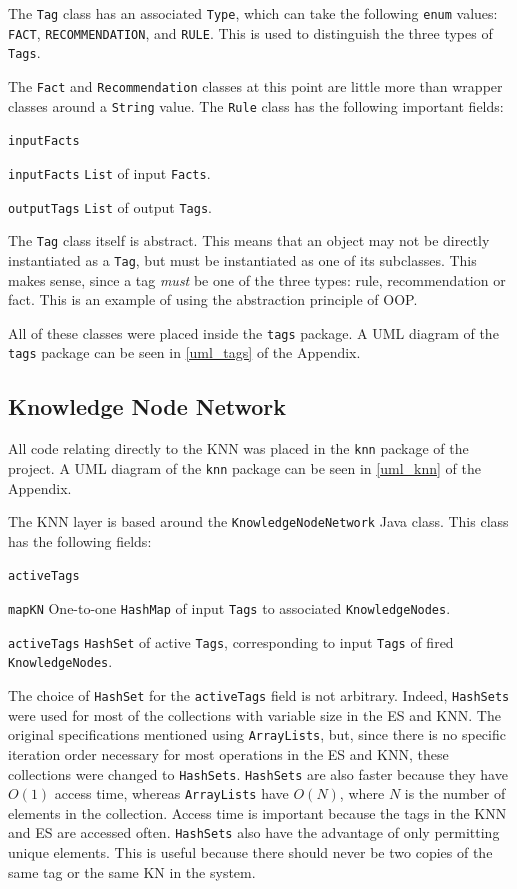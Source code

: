 \documentclass[titlepage,11pt]{article}
\newcommand{\code}[1]{\texttt{#1}}
\begin{document}
The \code{Tag} class has an associated \code{Type}, which can take the following \code{enum} values: \code{FACT}, \code{RECOMMENDATION}, and \code{RULE}. This is used to distinguish the three types of \code{Tags}.

The \code{Fact} and \code{Recommendation} classes at this point are little more than wrapper classes around a \code{String} value. The \code{Rule} class has the following important fields:

\begin{labeling}{\code{inputFacts}}
	\item[\code{inputFacts}] \code{List} of input \code{Facts}.
	\item[\code{outputTags}] \code{List} of output \code{Tags}.
\end{labeling}

The \code{Tag} class itself is abstract. This means that an object may not be directly instantiated as a \code{Tag}, but must be instantiated as one of its subclasses. This makes sense, since a tag \emph{must} be one of the three types: rule, recommendation or fact. This is an example of using the abstraction principle of OOP.

All of these classes were placed inside the \code{tags} package. A UML diagram of the \code{tags} package can be seen in \autoref{uml_tags} of the Appendix.

\subsection{Knowledge Node Network}

All code relating directly to the KNN was placed in the \code{knn} package of the project. A UML diagram of the \code{knn} package can be seen in \autoref{uml_knn} of the Appendix.

The KNN layer is based around the \code{KnowledgeNodeNetwork} Java class. This class has the following fields:

\begin{labeling}{\code{activeTags}}
	\item[\code{mapKN}] One-to-one \code{HashMap} of input \code{Tags} to associated \code{KnowledgeNodes}.
	\item[\code{activeTags}] \code{HashSet} of active \code{Tags}, corresponding to input \code{Tags} of fired \code{KnowledgeNodes}.
\end{labeling}

The choice of \code{HashSet} for the \code{activeTags} field is not arbitrary. Indeed, \code{HashSets} were used for most of the collections with variable size in the ES and KNN. The original specifications mentioned using \code{ArrayLists}, but, since there is no specific iteration order necessary for most operations in the ES and KNN, these collections were changed to \code{HashSets}. \code{HashSets} are also faster because they have $O(1)$ access time, whereas \code{ArrayLists} have $O(N)$, where $N$ is the number of elements in the collection. Access time is important because the tags in the KNN and ES are accessed often. \code{HashSets} also have the advantage of only permitting unique elements. This is useful because there should never be two copies of the same tag or the same KN in the system.
\end{document}
